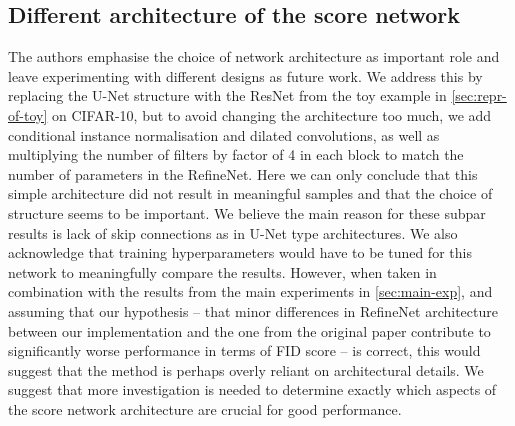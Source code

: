 \subsection{Different architecture of the score network}
The authors emphasise the choice of network architecture as important role and leave experimenting with different designs as future work. We address this by replacing the U-Net structure with the ResNet from the toy example in \autoref{sec:repr-of-toy} on CIFAR-10, but to avoid changing the architecture too much, we add conditional instance normalisation and dilated convolutions, as well as multiplying the number of filters by factor of 4 in each block to match the number of parameters in the RefineNet. Here we can only conclude that this simple architecture did not result in meaningful samples and that the choice of structure seems to be important. We believe the main reason for these subpar results is lack of skip connections as in U-Net type architectures. We also acknowledge that training hyperparameters would have to be tuned for this network to meaningfully compare the results. However, when taken in combination with the results from the main experiments in \autoref{sec:main-exp}, and assuming that our hypothesis -- that minor differences in RefineNet architecture between our implementation and the one from the original paper contribute to significantly worse performance in terms of FID score -- is correct, this would suggest that the method is perhaps overly reliant on architectural details. We suggest that more investigation is needed to determine exactly which aspects of the score network architecture are crucial for good performance.

